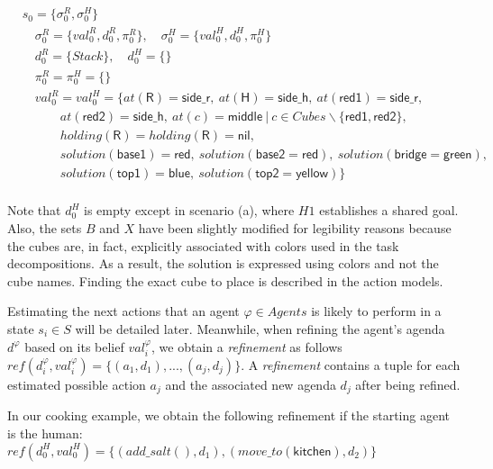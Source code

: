 {\small
\begin{align*}
&s_0 = \{\sigma^R_0, \sigma^H_0\} \\
&\quad \sigma^R_0 = \{ val^R_0, d^R_0, \pi^R_0 \}, \quad \sigma^H_0 = \{ val^H_0, d^H_0, \pi^H_0 \} \\
&\quad d^R_0 = \{ Stack \}, \quad d^H_0 = \{  \} \\
&\quad \pi^R_0 = \pi^H_0 = \{  \} \\
&\quad val^R_0 = val^H_0 = \{at(\textsf{R}) = \textsf{side\_r},~at(\textsf{H}) = \textsf{side\_h}, ~at(\textsf{red1}) = \textsf{side\_r}, \\
&\quad \quad \quad at(\textsf{red2}) = \textsf{side\_h}, ~at(c) = \textsf{middle} ~|~ c \in Cubes\backslash\{ \textsf{red1}, \textsf{red2} \}, \\
&\quad \quad \quad holding(\textsf{R}) = holding(\textsf{R}) = \textsf{nil}, \\
&\quad \quad \quad solution(\textsf{base1}) = \textsf{red}, ~solution(\textsf{base2} = \textsf{red}), ~solution(\textsf{bridge} = \textsf{green}),   \\
&\quad \quad \quad solution(\textsf{top1}) = \textsf{blue}, ~solution(\textsf{top2} = \textsf{yellow}) \}  \\
\end{align*}
}

Note that $d^H_0$ is empty except in scenario (a), where $H1$ establishes a shared goal. Also, the sets $B$ and $X$ have been slightly modified for legibility reasons because the cubes are, in fact, explicitly associated with colors used in the task decompositions. As a result, the solution is expressed using colors and not the cube names. Finding the exact cube to place is described in the action models.

Estimating the next actions that an agent $\varphi \in Agents$ is likely to perform in a state $s_i \in S$ will be detailed later. Meanwhile, when refining the agent's agenda $d^{\varphi}$ based on its belief $val^\varphi_i$, we obtain a \textit{refinement} as follows $\textit{ref}(d^\varphi_i, val^\varphi_i)= \{ (a_1,d_1),...,(a_j,d_j) \}$. 
A \textit{refinement} contains a tuple for each estimated possible action $a_j$ and the associated new agenda $d_j$ after being refined. 

In our cooking example, we obtain the following refinement if the starting agent is the human:\\
{\small
$\textit{ref}(d^H_0, val^H_0) = \{ (add\_salt(),d_1), (move\_to(\textsf{kitchen}),d_2) \}$
}

